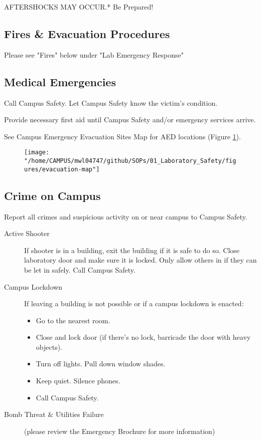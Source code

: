 \documentclass[12pt]{../SOP4_alpha}\usepackage[]{graphicx}\usepackage[]{color}
\begin{document}
\NP *AFTERSHOCKS MAY OCCUR.* Be Prepared!

\subsection*{Fires \& Evacuation Procedures}

Please see "Fires" below under "Lab Emergency Response"

\subsection{Medical Emergencies}

\NP Call Campus Safety. Let Campus Safety know the victim's condition. 

\NP Provide necessary first aid until Campus Safety and/or emergency services arrive.

\NP See Campus Emergency Evacuation Sites Map for AED locations (Figure \ref{fig:evacmap}).


\begin{figure}
\label{fig:evacmap}
\texttt{[image: "/home/CAMPUS/mwl04747/github/SOPs/01\_Laboratory\_Safety/figures/evacuation-map"]}
\end{figure}

\subsection*{Crime on Campus}

\NP Report all crimes and suspicious activity on or near campus to Campus Safety.

\begin{description}
  \item[Active Shooter]If shooter is in a building, exit the building if it is safe to do so. Close laboratory door and make sure it is locked. Only allow others in if they can be let in safely. Call Campus Safety.
  \item[Campus Lockdown] If leaving a building is not possible or if a campus lockdown is enacted:
\begin{itemize}
  \item Go to the nearest room.
  \item Close and lock door (if there’s no lock, barricade the door with heavy objects).
  \item Turn off lights. Pull down window shades.
  \item Keep quiet. Silence phones.
  \item Call Campus Safety.
\end{itemize}
  \item[Bomb Threat \& Utilities Failure](please review the Emergency Brochure for more information)
\end{description}
\end{document}
